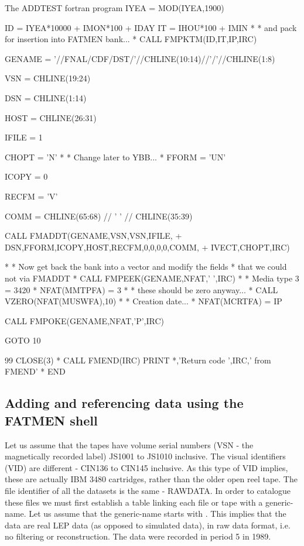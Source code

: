 \begin{XMPt}{The ADDTEST fortran program}
      IYEA   = MOD(IYEA,1900)

      ID     = IYEA*10000 + IMON*100 + IDAY
      IT     = IHOU*100   + IMIN
*
*     and pack for insertion into FATMEN bank...
*
      CALL FMPKTM(ID,IT,IP,IRC)
      
      GENAME = '//FNAL/CDF/DST/'//CHLINE(10:14)//'/'//CHLINE(1:8)

      VSN    = CHLINE(19:24)

      DSN    = CHLINE(1:14)

      HOST   = CHLINE(26:31)

      IFILE  = 1

      CHOPT  = 'N'
*
*     Change later to YBB...
*
      FFORM  = 'UN'

      ICOPY  = 0

      RECFM  = 'V'

      COMM   = CHLINE(65:68) // ' ' // CHLINE(35:39)
 
      CALL FMADDT(GENAME,VSN,VSN,IFILE,
     +            DSN,FFORM,ICOPY,HOST,RECFM,0,0,0,0,COMM,
     +            IVECT,CHOPT,IRC)

*
*     Now get back the bank into a vector and modify the fields
*     that we could not via FMADDT
*
      CALL FMPEEK(GENAME,NFAT,' ',IRC)
*
*     Media type 3 = 3420
*
      NFAT(MMTPFA) = 3
*
*     these should be zero anyway...
*
      CALL VZERO(NFAT(MUSWFA),10)
*
*     Creation date...
*
      NFAT(MCRTFA) = IP

      CALL FMPOKE(GENAME,NFAT,'P',IRC)

      GOTO 10

99    CLOSE(3)
*
      CALL FMEND(IRC)
      PRINT *,'Return code ',IRC,' from FMEND'
*
      END
\end{XMPt}

\subsection{Adding and referencing data using the FATMEN shell}

Let us assume that the tapes have volume serial numbers (VSN - the
magnetically recorded label) JS1001 to JS1010 inclusive. The visual
identifiers (VID) are different - CIN136 to CIN145 inclusive.
As this type of VID implies, these are actually IBM 3480 cartridges,
rather than the older open reel tape.
The file identifier of all the datasets is the same - RAWDATA.
In order to catalogue these files we must first establish a table
linking each file or tape with a generic-name.
Let us assume that the generic-name starts with
. 
This implies that
the data are real LEP data (as opposed to simulated data), in
raw data format, i.e. no filtering or reconstruction. The data
were recorded in period 5 in 1989.

